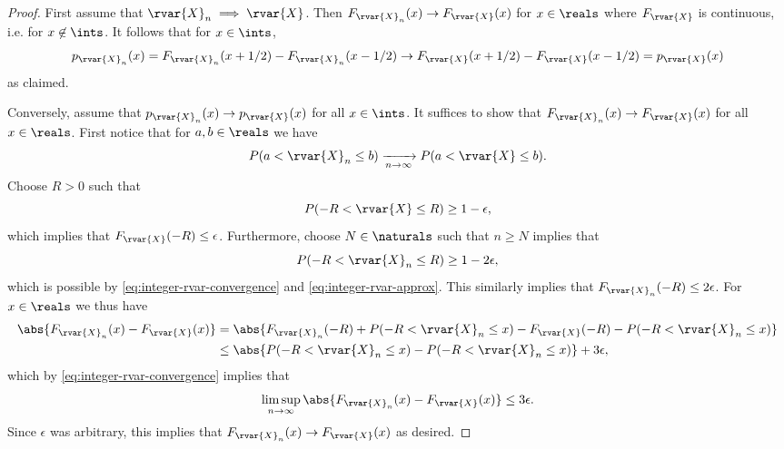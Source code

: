 \documentclass[article, a4paper, 11pt, oneside]{memoir}
\numberwithin{equation}{chapter}
\begin{document}
\begin{proof}
    First assume that $\rvar{X}_n \implies \rvar{X}$. Then $F_{\rvar{X}_n}(x) \to F_{\rvar{X}}(x)$ for $x \in \reals$ where $F_{\rvar{X}}$ is continuous, i.e. for $x \not\in \ints$. It follows that for $x \in \ints$,
    \begin{equation*}
        p_{\rvar{X}_n}(x)
            = F_{\rvar{X}_n}(x + 1/2) - F_{\rvar{X}_n}(x - 1/2)
            \to F_{\rvar{X}}(x + 1/2) - F_{\rvar{X}}(x - 1/2)
            = p_{\rvar{X}}(x)
    \end{equation*}
    as claimed.

    Conversely, assume that $p_{\rvar{X}_n}(x) \to p_{\rvar{X}}(x)$ for all $x \in \ints$. It suffices to show that $F_{\rvar{X}_n}(x) \to F_{\rvar{X}}(x)$ for all $x \in \reals$. First notice that for $a,b \in \reals$ we have
    \begin{equation}
        \label{eq:integer-rvar-convergence}
        P(a < \rvar{X}_n \leq b)
            \xrightarrow[n\to\infty]{}
            P(a < \rvar{X} \leq b).
    \end{equation}
    Choose $R > 0$ such that
    \begin{equation}
        \label{eq:integer-rvar-approx}
        P(-R < \rvar{X} \leq R)
            \geq 1 - \epsilon,
    \end{equation}
    which implies that $F_{\rvar{X}}(-R) \leq \epsilon$. Furthermore, choose $N \in \naturals$ such that $n \geq N$ implies that
    \begin{equation*}
        P(-R < \rvar{X}_n \leq R)
            \geq 1 - 2\epsilon,
    \end{equation*}
    which is possible by \cref{eq:integer-rvar-convergence} and \cref{eq:integer-rvar-approx}. This similarly implies that $F_{\rvar{X}_n}(-R) \leq 2\epsilon$. For $x \in \reals$ we thus have
    \begin{align*}
        \abs{ F_{\rvar{X}_n}(x) - F_{\rvar{X}}(x) }
            &= \abs{ F_{\rvar{X}_n}(-R) + P(-R < \rvar{X}_n \leq x) - F_{\rvar{X}}(-R) - P(-R < \rvar{X}_n \leq x) } \\
            &\leq \abs{ P(-R < \rvar{X}_n \leq x) - P(-R < \rvar{X}_n \leq x) } + 3\epsilon,
    \end{align*}
    which by \cref{eq:integer-rvar-convergence} implies that
    \begin{equation*}
        \limsup_{n\to\infty} \abs{ F_{\rvar{X}_n}(x) - F_{\rvar{X}}(x) }
            \leq 3\epsilon.
    \end{equation*}
    Since $\epsilon$ was arbitrary, this implies that $F_{\rvar{X}_n}(x) \to F_{\rvar{X}}(x)$ as desired.
\end{proof}
\end{document}
